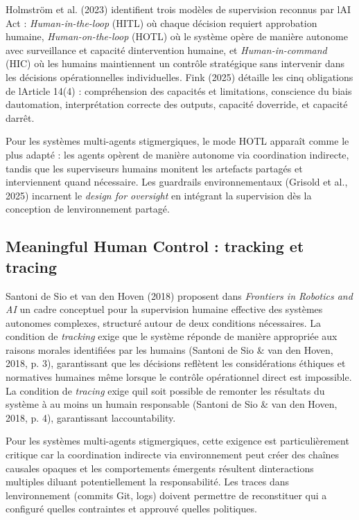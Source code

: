 \documentclass[12pt,a4paper]{article}
\begin{document}
Holmström et al. (2023) identifient trois modèles de supervision
reconnus par l\textquotesingle AI Act : \emph{Human-in-the-loop} (HITL)
où chaque décision requiert approbation humaine,
\emph{Human-on-the-loop} (HOTL) où le système opère de manière autonome
avec surveillance et capacité d\textquotesingle intervention humaine, et
\emph{Human-in-command} (HIC) où les humains maintiennent un contrôle
stratégique sans intervenir dans les décisions opérationnelles
individuelles. Fink (2025) détaille les cinq obligations de
l\textquotesingle Article 14(4) : compréhension des capacités et
limitations, conscience du biais d\textquotesingle automation,
interprétation correcte des outputs, capacité
d\textquotesingle override, et capacité d\textquotesingle arrêt.

Pour les systèmes multi-agents stigmergiques, le mode HOTL apparaît
comme le plus adapté : les agents opèrent de manière autonome via
coordination indirecte, tandis que les superviseurs humains monitent les
artefacts partagés et interviennent quand nécessaire. Les guardrails
environnementaux (Grisold et al., 2025) incarnent le \emph{design for
oversight} en intégrant la supervision dès la conception de
l\textquotesingle environnement partagé.

\subsection{Meaningful Human Control : tracking et
tracing}\label{meaningful-human-control--tracking-et-tracing}

Santoni de Sio et van den Hoven (2018) proposent dans \emph{Frontiers in
Robotics and AI} un cadre conceptuel pour la supervision humaine
effective des systèmes autonomes complexes, structuré autour de deux
conditions nécessaires. La condition de \emph{tracking} exige que le
système réponde de manière appropriée aux raisons morales identifiées
par les humains (Santoni de Sio \& van den Hoven, 2018, p. 3),
garantissant que les décisions reflètent les considérations éthiques et
normatives humaines même lorsque le contrôle opérationnel direct est
impossible. La condition de \emph{tracing} exige qu\textquotesingle il
soit possible de remonter les résultats du système à au moins un humain
responsable (Santoni de Sio \& van den Hoven, 2018, p. 4), garantissant
l\textquotesingle accountability.

Pour les systèmes multi-agents stigmergiques, cette exigence est
particulièrement critique car la coordination indirecte via
environnement peut créer des chaînes causales opaques et les
comportements émergents résultent d\textquotesingle interactions
multiples diluant potentiellement la responsabilité. Les traces dans
l\textquotesingle environnement (commits Git, logs) doivent permettre de
reconstituer qui a configuré quelles contraintes et approuvé quelles
politiques.
\end{document}
